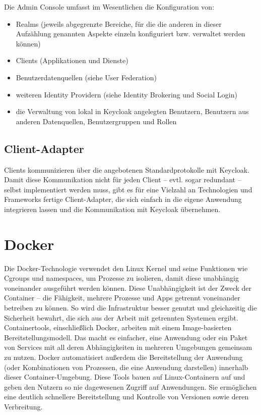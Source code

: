 Die Admin Console umfasst im Wesentlichen die Konfiguration von:
\begin{itemize}
    \item Realms (jeweils abgegrenzte Bereiche, für die die anderen in dieser Aufzählung genannten Aspekte einzeln konfiguriert bzw. verwaltet werden können)
    \item Clients (Applikationen und Dienste)
    \item Benutzerdatenquellen (siehe User Federation)
    \item weiteren Identity Providern (siehe Identity Brokering und Social Login)
    \item die Verwaltung von lokal in Keycloak angelegten Benutzern, Benutzern aus anderen Datenquellen, Benutzergruppen und Rollen
\end{itemize}
\cite{sysarch-keycloak-2}

\subsection{Client-Adapter}

Clients kommunizieren über die angebotenen Standardprotokolle mit Keycloak. Damit diese Kommunikation nicht für jeden Client – evtl. sogar redundant – selbst implementiert werden muss, 
gibt es für eine Vielzahl an Technologien und Frameworks fertige Client-Adapter, die sich einfach in die eigene Anwendung integrieren lassen und die Kommunikation mit Keycloak übernehmen. 
\cite{sysarch-keycloak-2}

\section{Docker}

Die Docker-Technologie verwendet den Linux Kernel und seine Funktionen wie Cgroups und namespaces, um Prozesse zu isolieren, damit diese unabhängig voneinander ausgeführt werden können. 
Diese Unabhängigkeit ist der Zweck der Container – die Fähigkeit, mehrere Prozesse und Apps getrennt voneinander betreiben zu können. 
So wird die Infrastruktur besser genutzt und gleichzeitig die Sicherheit bewahrt, die sich aus der Arbeit mit getrennten Systemen ergibt.
Containertools, einschließlich Docker, arbeiten mit einem Image-basierten Bereitstellungsmodell. Das macht es einfacher, eine Anwendung oder ein Paket von Services mit all deren 
Abhängigkeiten in mehreren Umgebungen gemeinsam zu nutzen. Docker automatisiert außerdem die Bereitstellung der Anwendung 
(oder Kombinationen von Prozessen, die eine Anwendung darstellen) innerhalb dieser Container-Umgebung. Diese Tools bauen auf Linux-Containern auf 
und geben den Nutzern so nie dagewesenen Zugriff auf Anwendungen. Sie ermöglichen eine deutlich schnellere Bereitstellung und Kontrolle von Versionen sowie deren Verbreitung.
\cite{sysarch-docker-1}

